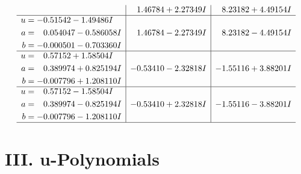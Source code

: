 \documentclass[1p]{elsarticle_modified}
\theoremstyle{definition}
\begin{document}
$$\begin{array}{c|c|c}
 & \phantom{-}1.46784 + 2.27349 I & \phantom{-}8.23182 + 4.49154 I \\ \hline\begin{aligned}
u &= -0.51542 - 1.49486 I \\
a &= \phantom{-}0.054047 - 0.586058 I \\
b &= -0.000501 - 0.703360 I\end{aligned}
 & \phantom{-}1.46784 - 2.27349 I & \phantom{-}8.23182 - 4.49154 I \\ \hline\begin{aligned}
u &= \phantom{-}0.57152 + 1.58504 I \\
a &= \phantom{-}0.389974 + 0.825194 I \\
b &= -0.007796 + 1.208110 I\end{aligned}
 & -0.53410 - 2.32818 I & -1.55116 + 3.88201 I \\ \hline\begin{aligned}
u &= \phantom{-}0.57152 - 1.58504 I \\
a &= \phantom{-}0.389974 - 0.825194 I \\
b &= -0.007796 - 1.208110 I\end{aligned}
 & -0.53410 + 2.32818 I & -1.55116 - 3.88201 I\\
 \hline 
 \end{array}$$\newpage
\newpage\renewcommand{\arraystretch}{1}
\centering \section*{ III. u-Polynomials}
\end{document}

